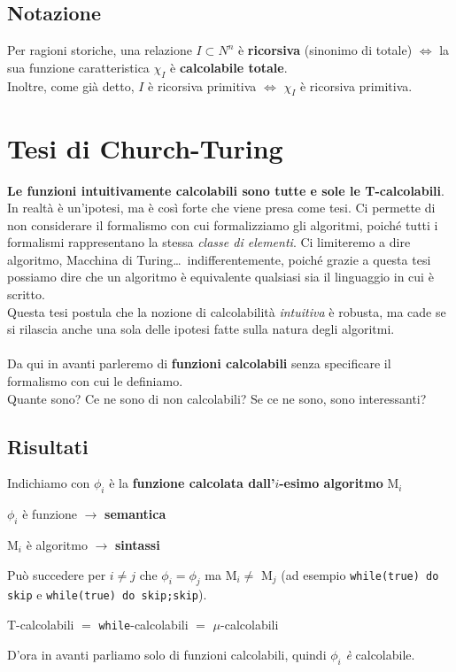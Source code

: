\documentclass[10pt]{book}
\begin{document}
\subsection{Notazione}
Per ragioni storiche, una relazione $I \subset N^n$ è \textbf{ricorsiva} (sinonimo di totale) $\Leftrightarrow$ la sua funzione caratteristica $\chi_I$ è \textbf{calcolabile totale}.\\
Inoltre, come già detto, $I$ è ricorsiva primitiva $\Leftrightarrow$ $\chi_I$ è ricorsiva primitiva.
\section{Tesi di Church-Turing}
\textbf{Le funzioni intuitivamente calcolabili sono tutte e sole le T-calcolabili}.\\
In realtà è un'ipotesi, ma è così forte che viene presa come tesi. Ci permette di non considerare il formalismo con cui formalizziamo gli algoritmi, poiché tutti i formalismi rappresentano la stessa \textit{classe di elementi}. Ci limiteremo a dire algoritmo, Macchina di Turing\ldots$\,$ indifferentemente, poiché grazie a questa tesi possiamo dire che un algoritmo è equivalente qualsiasi sia il linguaggio in cui è scritto.\\
Questa tesi postula che la nozione di calcolabilità \textit{intuitiva} è robusta, ma cade se si rilascia anche una sola delle ipotesi fatte sulla natura degli algoritmi.\\\\
Da qui in avanti parleremo di \textbf{funzioni calcolabili} senza specificare il formalismo con cui le definiamo.\\
Quante sono? Ce ne sono di non calcolabili? Se ce ne sono, sono interessanti?
\subsection{Risultati}
Indichiamo con $\phi_i$ è la \textbf{funzione calcolata dall'$i$-esimo algoritmo} M$_i$
\begin{list}{}{}
	\item $\phi_i$ è funzione $\rightarrow$ \textbf{semantica}
	\item M$_i$ è algoritmo $\rightarrow$ \textbf{sintassi}
\end{list}
Può succedere per $i \neq j$ che $\phi_i = \phi_j$ ma M$_i \neq$ M$_j$ (ad esempio \texttt{while(true) do skip} e \texttt{while(true) do skip;skip}).
\begin{center}
T-calcolabili $=$ \texttt{while}-calcolabili $=$ $\mu$-calcolabili
\end{center}
D'ora in avanti parliamo solo di funzioni calcolabili, quindi $\phi_i$ \textit{è} calcolabile.
\end{document}

